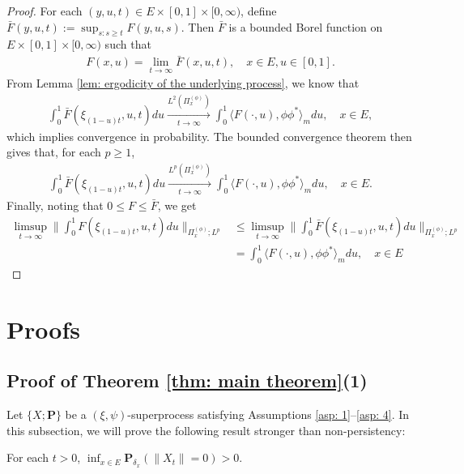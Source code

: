 \begin{proof}
	For each $(y,u,t)\in E\times [0,1]\times [0,\infty)$, define $\bar F(y,u,t) := \sup_{s:s\geq t} F(y,u,s)$.
	Then $\bar F$ is a bounded Borel  function on $E\times [0,1]\times [0,\infty)$ such that
\begin{align}
	F(x,u)
	= \lim_{t\to \infty} \bar F(x,u,t),
	\quad x\in E, u\in [0,1].
\end{align}
	From Lemma \ref{lem: ergodicity of the underlying process}, we know that
\begin{align}
	\int_0^1 \bar F(\xi_{(1-u)t},u,t) du
	\xrightarrow[t\to \infty]{L^2(\Pi_x^{(\phi)})}
	\int_0^1 \langle F(\cdot , u), \phi\phi^*\rangle_m du,
	\quad x\in E,
\end{align}
    which implies convergence in probability.
	The bounded convergence theorem then gives that, for each $p \geq 1$,
\begin{align}
	\int_0^1 \bar F(\xi_{(1-u)t},u,t) du
	\xrightarrow[t\to \infty]{L^p(\Pi_x^{(\phi)})}
	\int_0^1 \langle F(\cdot , u), \phi\phi^*\rangle_m du,
	\quad x\in E.
\end{align}
	Finally,
    noting that $0\leq F \leq \bar F$, we get
\begin{align}
	\limsup_{ t \to \infty}  \Big\| \int_0^1 F(\xi_{(1-u) t },u,t) du  \Big\|_{\Pi_x^{(\phi)};L^p}
	&\leq \limsup_{ t \to \infty}  \Big\| \int_0^1 \bar F(\xi_{(1-u) t },u,t) du  \Big\|_{\Pi_x^{(\phi)};L^p}
	\\& = \int_0^1 \langle F(\cdot, u), \phi \phi^*\rangle_m du,
	\quad x\in E
\end{align}
\end{proof}

\section{Proofs}
\subsection{Proof of Theorem \ref{thm: main theorem}(1)}
\label{sec: proof of result 1}
	Let $\{X; \mathbf P\}$ be a $(\xi, \psi)$-superprocess satisfying
	Assumptions \ref{asp: 1}--\ref{asp: 4}.
	In this subsection, we will prove the following result stronger than non-persistency:

\begin{prop} \label{prop: non-presistent}
	For each $t > 0$, $\inf_{x\in E} \mathbf P_{\delta_x}(\|X_t\|= 0) > 0$.
\end{prop}

